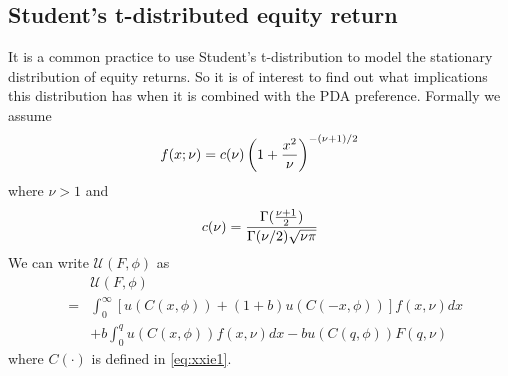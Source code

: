 \documentclass{article}
\begin{document}













\subsection{Student's t-distributed equity return}
It is a common practice to use Student's t-distribution to model the
stationary distribution of equity returns. So it is of interest to
find out what implications this distribution has when it is combined
with the PDA preference. Formally we assume
\[
f(x; \nu) = c(\nu) \left(
  1 + {x^2 \over \nu}
\right)^{-(\nu + 1)/2}
\]
where $\nu > 1$ and
\[
c(\nu) = {
  \Gamma({\nu + 1 \over 2})
  \over
  \Gamma(\nu/2) \sqrt{\nu \pi}
}
\]
We can write $\mathcal U(F, \phi)$ as
\begin{eqnarray}
  && \mathcal U(F, \phi) \nonumber \\
  &=&
  \int_{0}^{\infty}
  \left[
    u(C(x, \phi)) + (1 + b)u(C(-x, \phi))
  \right]
  f(x, \nu) dx \nonumber \\
  &&
  + b \int_{0}^{q}
  u(C(x, \phi))
  f(x, \nu) dx - b u(C(q, \phi)) F(q, \nu)
  \label{eq:t1}
\end{eqnarray}
where $C(\cdot)$ is defined in \eqref{eq:xxie1}.
\end{document}
